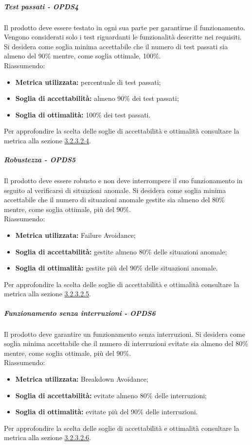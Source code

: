 \documentclass[PianoDiQualifica.tex]{subfiles}
\begin{document}
				\subparagraph{Test passati - OPDS4}
				Il prodotto deve essere testato in ogni sua parte per garantirne il funzionamento. Vengono considerati solo i test riguardanti le funzionalità descritte nei requisiti.
				Si desidera come soglia minima accettabile che il numero di test passati sia almeno del 90\% mentre, come soglia ottimale, 100\%. \\
				Riassumendo:
				\begin{itemize}
				\item \textbf{Metrica utilizzata:} percentuale di test passati;
				\item \textbf{Soglia di accettabilità:} almeno 90\% dei test passati;
				\item \textbf{Soglia di ottimalità:} 100\% dei test passati.
				\end{itemize}
				Per approfondire la scelta delle soglie di accettabilità e ottimalità consultare la metrica alla sezione \hyperlink{test_passati}{3.2.3.2.4}.

				\subparagraph{Robustezza - OPDS5}
				Il prodotto deve essere robusto e non deve interrompere il suo funzionamento in seguito al verificarsi di situazioni anomale.
				Si desidera come soglia minima accettabile che il numero di situazioni anomale gestite sia almeno del 80\% mentre, come soglia ottimale, più del 90\%. \\
				Riassumendo:  
				\begin{itemize}
				\item \textbf{Metrica utilizzata:} Failure Avoidance;
				\item \textbf{Soglia di accettabilità:} gestite almeno 80\% delle situazioni anomale;
				\item \textbf{Soglia di ottimalità:} gestite più del 90\% delle situazioni anomale.
				\end{itemize}
				Per approfondire la scelta delle soglie di accettabilità e ottimalità consultare la metrica alla sezione \hyperlink{failure}{3.2.3.2.5}.

				\subparagraph{Funzionamento senza interruzioni - OPDS6}
				Il prodotto deve garantire un funzionamento senza interruzioni.
				Si desidera come soglia minima accettabile che il numero di interruzioni evitate sia almeno del 80\% mentre, come soglia ottimale, più del 90\%. \\
				Riassumendo:
				\begin{itemize}
				\item \textbf{Metrica utilizzata:} Breakdown Avoidance;
				\item \textbf{Soglia di accettabilità:} evitate almeno 80\% delle interruzioni;
				\item \textbf{Soglia di ottimalità:} evitate più del 90\% delle interruzioni.
				\end{itemize}
				Per approfondire la scelta delle soglie di accettabilità e ottimalità consultare la metrica alla sezione \hyperlink{breakdown}{3.2.3.2.6}.
\end{document}
